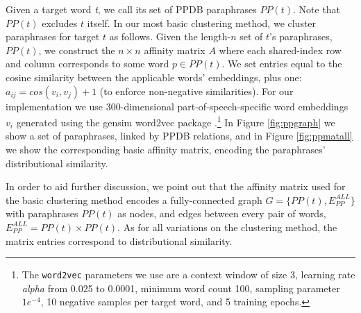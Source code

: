 \documentclass[11pt]{article}
\begin{document}
	Given a target word \textit{t}, we call its set of PPDB paraphrases $PP(t)$. Note that $PP(t)$ excludes $t$ itself. In our most basic clustering method, we cluster paraphrases for target $t$ as follows. Given the length-$n$ set of $t$'s paraphrases, $PP(t)$, we construct the $n \times n$ affinity matrix $A$ where each shared-index row and column corresponds to some word $p \in PP(t)$. We set entries equal to the cosine similarity between the applicable words' embeddings, plus one: $a_{ij} = cos(v_i,v_j) + 1$ (to enforce non-negative similarities). For our implementation we use 300-dimensional part-of-speech-specific word embeddings $v_i$ generated using the gensim word2vec package \cite{mikolov2013distributed,mikolov2013efficient,ismu:884893}.\footnote{The \texttt{word2vec} parameters we use are a context window of size 3, learning rate \textit{alpha} from 0.025 to 0.0001, minimum word count 100, sampling parameter $1e^{-4}$, 10 negative samples per target word, and 5 training epochs.} In Figure \ref{fig:ppgraph} we show a set of paraphrases, linked by PPDB relations, and in Figure \ref{fig:ppmatall} we show the corresponding basic affinity matrix, encoding the paraphrases' distributional similarity.
	
	In order to aid further discussion, we point out that the affinity matrix used for the basic clustering method encodes a fully-connected graph $G = \{PP(t), E_{PP}^{ALL}\}$ with paraphrases $PP(t)$ as nodes, and edges between every pair of words, $E_{PP}^{ALL} = PP(t) \times PP(t)$. As for all variations on the clustering method, the matrix entries correspond to distributional similarity.
	
\end{document}
